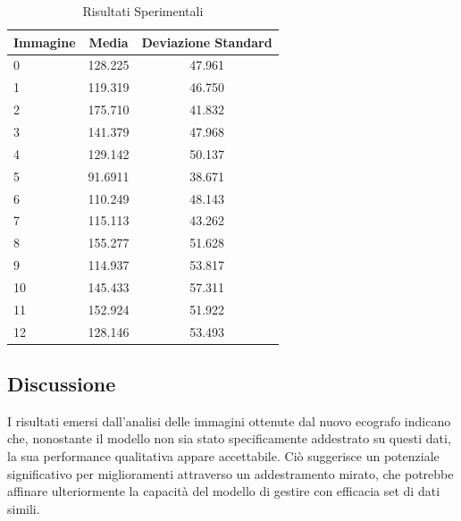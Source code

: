 \begin{table}[ht]
	\centering
	\begin{tabular}{|l|c|c|}
		\hline
		\textbf{Immagine} & \textbf{Media} & \textbf{Deviazione Standard} \\
		\hline
		\hline
		0                 & 128.225        & 47.961                       \\ \hline
		1                 & 119.319        & 46.750                       \\ \hline
		2                 & 175.710        & 41.832                       \\ \hline
		3                 & 141.379        & 47.968                       \\ \hline
		4                 & 129.142        & 50.137                       \\ \hline
		5                 & 91.6911        & 38.671                       \\ \hline
		6                 & 110.249        & 48.143                       \\ \hline
		7                 & 115.113        & 43.262                       \\ \hline
		8                 & 155.277        & 51.628                       \\ \hline
		9                 & 114.937        & 53.817                       \\ \hline
		10                & 145.433        & 57.311                       \\ \hline
		11                & 152.924        & 51.922                       \\ \hline
		12                & 128.146        & 53.493                       \\ \hline
	\end{tabular}
	\caption{Risultati Sperimentali}
	\label{tab:risultati_sperimentali}
\end{table}

\subsection{Discussione}
\label{subsec:discussione}
I risultati emersi dall'analisi delle immagini ottenute dal nuovo ecografo indicano che, nonostante
il modello non sia stato specificamente addestrato su questi dati, la sua performance qualitativa
appare accettabile. Ciò suggerisce un potenziale significativo per miglioramenti attraverso un
addestramento mirato, che potrebbe affinare ulteriormente la capacità del modello di gestire con
efficacia set di dati simili.

